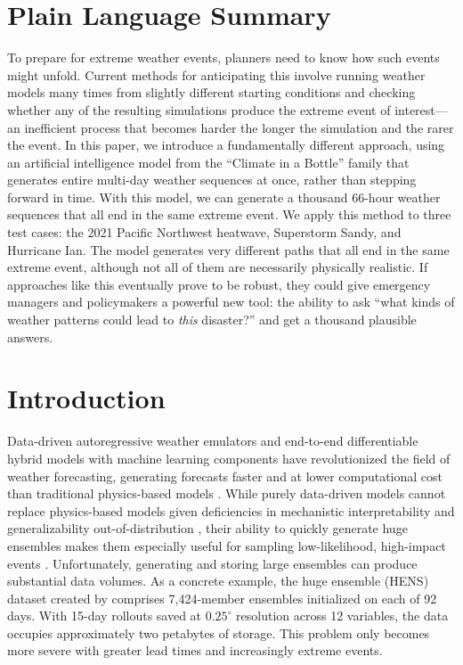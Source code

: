 \documentclass[final]{agujournal2019}
\begin{document}
\section*{Plain Language Summary}

To prepare for extreme weather events, planners need to know how such events might unfold. Current methods for anticipating this involve running weather models many times from slightly different starting conditions and checking whether any of the resulting simulations produce the extreme event of interest---an inefficient process that becomes harder the longer the simulation and the rarer the event. In this paper, we introduce a fundamentally different approach, using an artificial intelligence model from the ``Climate in a Bottle'' family that generates entire multi-day weather sequences at once, rather than stepping forward in time. With this model, we can generate a thousand 66-hour weather sequences that all end in the same extreme event. We apply this method to three test cases: the 2021 Pacific Northwest heatwave, Superstorm Sandy, and Hurricane Ian. The model generates very different paths that all end in the same extreme event, although not all of them are necessarily physically realistic. If approaches like this eventually prove to be robust, they could give emergency managers and policymakers a powerful new tool: the ability to ask ``what kinds of weather patterns could lead to \textit{this} disaster?'' and get a thousand plausible answers.

%
%
\section{Introduction}

Data-driven autoregressive weather emulators and end-to-end differentiable hybrid models with machine learning components have revolutionized the field of weather forecasting, generating forecasts faster and at lower computational cost than traditional physics-based models \cite{Bi2023-bg, Lam2023-jq, Kochkov2024-uy, Watt-Meyer2025-oj, Bonev2025-dw, Davenport2026-ro, Yuval2026-pk, Gentine2026-ml}. While purely data-driven models cannot replace physics-based models given deficiencies in mechanistic interpretability and generalizability out-of-distribution \cite{Sun2025-mh, Craig2026-ex, Hover2026-wv, Merchant2026-ex}, their ability to quickly generate huge ensembles makes them especially useful for sampling low-likelihood, high-impact events \cite{Mahesh2025-py, Mahesh2025-ue}. Unfortunately, generating and storing large ensembles can produce substantial data volumes. As a concrete example, the huge ensemble (HENS) dataset created by  comprises 7,424-member ensembles initialized on each of 92 days. With 15-day rollouts saved at $0.25^{\circ}$ resolution across 12 variables, the data occupies approximately two petabytes of storage. This problem only becomes more severe with greater lead times and increasingly extreme events.
\end{document}
